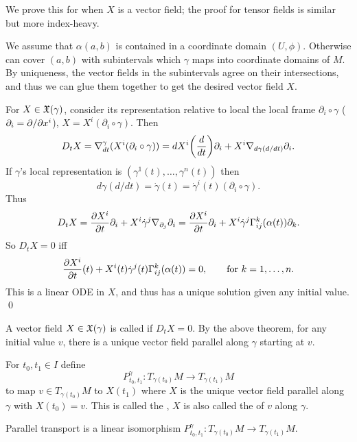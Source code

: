 \ethrm

\bproof

    We prove this for when $X$ is a vector field; the proof for tensor fields is similar but more index-heavy.

    We assume that $\alpha(a,b)$ is contained in a coordinate domain $(U,\phi)$.
    Otherwise can cover $(a,b)$ with subintervals which $\gamma$ maps into coordinate domains of $M$.
    By uniqueness, the vector fields in the subintervals agree on their intersections, and thus we can glue them together
    to get the desired vector field $X$.

    For $X\in{\frak X}(\gamma)$, consider its representation relative to local the local frame $\partial_i\circ\gamma$
    ($\partial_i=\partial /\partial x^i$), $X=X^i(\partial_i\circ\gamma)$.
    Then
    $$ D_tX = \nabla^\gamma_{dt}(X^i(\partial_i\circ\gamma)) = dX^i\mathopen{}\mathclose{\left({{d}\over{dt}}\right)}\partial_i +
    X^i\nabla_{d\gamma(d/dt)}\partial_i . $$
    If $\gamma$'s local representation is $(\gamma^1(t),\dots,\gamma^n(t))$ then
    $$ d\gamma(d/dt) = \dot\gamma(t) = \dot\gamma^i(t)(\partial_i\circ\gamma) . $$
    Thus
    $$ D_tX = {{\partial X^i}\over{\partial t}}\partial_i + X^i\dot\gamma^j\nabla_{\partial_j}\partial_i =
    {{\partial X^i}\over{\partial t}}\partial_i + X^i\dot\gamma^j\Gamma_{ij}^k(\alpha(t))\partial_k . $$
    So $D_tX=0$ iff
    $$ {{\partial X^i}\over{\partial t}}(t) + X^i(t)\dot\gamma^j(t)\Gamma_{ij}^k(\alpha(t)) = 0,\qquad \hbox{for $k=1,\dots,n$} . $$
    This is a linear ODE in $X$, and thus has a unique solution given any initial value.
    \qed

\eproof

\bdefn

    A vector field $X\in{\frak X}(\gamma)$ is called  if $D_tX=0$.
    By the above theorem, for any initial value $v$, there is a unique vector field parallel along $\gamma$ starting
    at $v$.

    For $t_0,t_1\in I$ define
    $$ P^\gamma_{t_0,t_1}\colon T_{\gamma(t_0)}M\to T_{\gamma(t_1)}M $$
    to map $v\in T_{\gamma(t_0)}M$ to $X(t_1)$ where $X$ is the unique vector field parallel along $\gamma$
    with $X(t_0)=v$.
    This is called the , $X$ is also called the  of $v$
    along $\gamma$.

\edefn

\bprop

    Parallel transport is a linear isomorphism $P^\gamma_{t_0,t_1}\colon T_{\gamma(t_0)}M\to T_{\gamma(t_1)}M$.

\eprop

